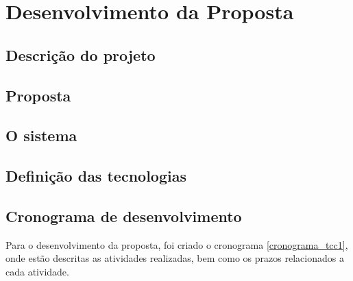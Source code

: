 

\chapter[Desenvolvimento da Proposta]{Desenvolvimento da Proposta}


\section{Descrição do projeto}


\section{Proposta}



\section{O sistema}

\section{Definição das tecnologias}

\section{Cronograma de desenvolvimento}

Para o desenvolvimento da proposta, foi criado o cronograma \ref{cronograma_tcc1}, onde estão descritas as atividades realizadas, bem como os prazos relacionados a cada atividade.

